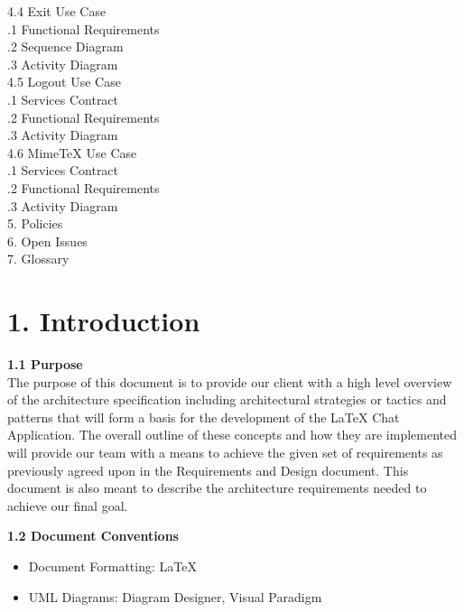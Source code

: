 \documentclass[29pt,a4paper]{moderncv}
\begin{document}
\begin{tabbing}
4.4 Exit Use Case \> \\
.1 Functional Requirements \\
.2 Sequence Diagram \\
.3 Activity Diagram \\
4.5 Logout Use Case \> \\
.1 Services Contract \\
.2 Functional Requirements  \\
.3 Activity Diagram \\
4.6 MimeTeX Use Case \> \\
.1 Services Contract \\
.2 Functional Requirements \\
.3 Activity Diagram \\
5. Policies \> 			\\					
6. Open Issues \> 			\\				
7. Glossary \> 			\\				

\end{tabbing}
\newpage
	\section*{\textbf{1. Introduction}}
	\vspace{4mm}
	
		\textbf{1.1 Purpose}
			\\The purpose of this document is to provide our client with a high level overview of the architecture specification including architectural strategies or tactics and patterns that will form a basis for the development of the LaTeX Chat Application. The overall outline of these concepts and how they are implemented will provide our team with a means to achieve the given set of requirements as previously agreed upon in the Requirements and Design document. This document is also meant to describe the architecture requirements needed to achieve our final goal.\\
		\vspace{1mm}
		
		\noindent \textbf{1.2 Document Conventions}
			\begin{itemize}
				\item Document Formatting: LaTeX
				\item UML Diagrams: Diagram Designer, Visual Paradigm
			\end{itemize}
		\vspace{5mm}
		
\end{document}
